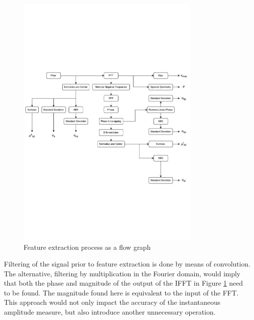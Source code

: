 \documentclass[10pt,onecolumn]{witseiepaper}
\begin{document}
\begin{figure}[h!]
	\centering
	\includegraphics[trim=0cm 10cm 0cm 11cm, clip=true,width=0.8\textwidth]{large.pdf}
	\caption{Feature extraction process as a flow graph}
	\label{fig:feature}
\end{figure}

Filtering of the signal prior to feature extraction is done by means of convolution. The alternative, filtering by multiplication in the Fourier domain, would imply that both the phase and magnitude of the output of the IFFT in Figure \ref{fig:feature} need to be found. The magnitude found here is equivalent to the input of the FFT. This approach would not only impact the accuracy of the instantaneous amplitude measure, but also introduce another unnecessary operation.

\end{document}

